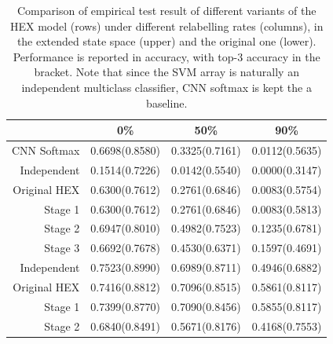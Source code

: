 \documentclass[11pt,a4paper]{book}
\begin{document}
\begin{table}[htbp]
\centering
\begin{tabular}{r|c|c|c}
 & 0\% & 50\% & 90\%\\
\hline
CNN Softmax  & 0.6698(0.8580) & 0.3325(0.7161) & 0.0112(0.5635)\\
Independent  & 0.1514(0.7226) & 0.0142(0.5540) & 0.0000(0.3147)\\
Original HEX & 0.6300(0.7612) & 0.2761(0.6846) & 0.0083(0.5754)\\
Stage 1      & 0.6300(0.7612) & 0.2761(0.6846) & 0.0083(0.5813)\\
Stage 2      & 0.6947(0.8010) & 0.4982(0.7523) & 0.1235(0.6781)\\
Stage 3      & 0.6692(0.7678) & 0.4530(0.6371) & 0.1597(0.4691)\\
\hline
Independent  & 0.7523(0.8990) & 0.6989(0.8711) & 0.4946(0.6882)\\
Original HEX & 0.7416(0.8812) & 0.7096(0.8515) & 0.5861(0.8117)\\
Stage 1      & 0.7399(0.8770) & 0.7090(0.8456) & 0.5855(0.8117)\\
Stage 2      & 0.6840(0.8491) & 0.5671(0.8176) & 0.4168(0.7553)
\end{tabular}
\caption{Comparison of empirical test result of different variants of the 	HEX model (rows) under different relabelling rates (columns), in the extended state space (upper) and the original one (lower). Performance is reported in accuracy, with top-3 accuracy in the bracket. Note that since the SVM array is naturally an independent multiclass classifier, CNN softmax is kept the a baseline.}
\label{tab:svmacc}
\end{table}
\end{document}
